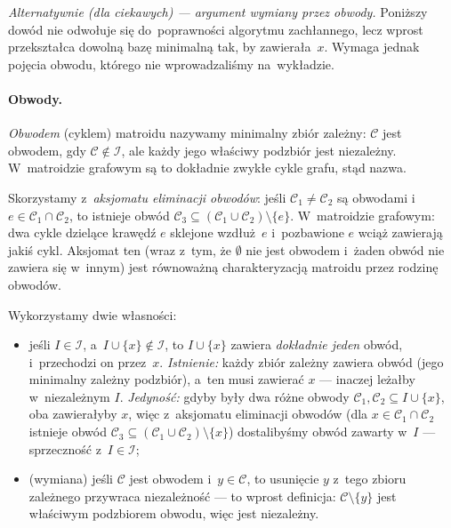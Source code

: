 \medskip
\noindent\emph{Alternatywnie (dla ciekawych) --- argument wymiany przez obwody.}
Poniższy dowód nie odwołuje się do~poprawności algorytmu zachłannego, lecz wprost
przekształca dowolną bazę minimalną tak, by zawierała~$x$. Wymaga jednak pojęcia
obwodu, którego nie wprowadzaliśmy na~wykładzie.

\paragraph{Obwody.}
\emph{Obwodem} (cyklem) matroidu nazywamy minimalny zbiór zależny: $\mathcal{C}$
jest obwodem, gdy $\mathcal{C}\notin\mathcal{I}$, ale każdy jego właściwy podzbiór
jest niezależny. W~matroidzie grafowym są to dokładnie zwykłe cykle grafu, stąd
nazwa.

\begin{dygresja}
	Skorzystamy z~\emph{aksjomatu eliminacji obwodów}: jeśli
	$\mathcal{C}_1\ne\mathcal{C}_2$ są obwodami i~$e\in\mathcal{C}_1\cap\mathcal{C}_2$,
	to istnieje obwód $\mathcal{C}_3\subseteq(\mathcal{C}_1\cup\mathcal{C}_2)
	\setminus\{e\}$. W~matroidzie grafowym: dwa cykle dzielące krawędź $e$ sklejone
	wzdłuż~$e$ i~pozbawione $e$ wciąż zawierają jakiś cykl. Aksjomat ten (wraz z~tym,
	że $\emptyset$ nie jest obwodem i~żaden obwód nie zawiera się w~innym) jest
	równoważną charakteryzacją matroidu przez rodzinę obwodów.
\end{dygresja}

Wykorzystamy dwie własności:
\begin{itemize}
	\item jeśli $I\in\mathcal{I}$, a~$I\cup\{x\}\notin\mathcal{I}$, to $I\cup\{x\}$
		zawiera \emph{dokładnie jeden} obwód, i~przechodzi on przez~$x$. \emph{Istnienie:}
		każdy zbiór zależny zawiera obwód (jego minimalny zależny podzbiór), a~ten
		musi zawierać $x$ --- inaczej leżałby w~niezależnym $I$. \emph{Jedyność:}
		gdyby były dwa różne obwody $\mathcal{C}_1,\mathcal{C}_2\subseteq I\cup\{x\}$,
		oba zawierałyby $x$, więc z~aksjomatu eliminacji obwodów (dla
		$x\in\mathcal{C}_1\cap\mathcal{C}_2$ istnieje obwód
		$\mathcal{C}_3\subseteq(\mathcal{C}_1\cup\mathcal{C}_2)\setminus\{x\}$)
		dostalibyśmy obwód zawarty w~$I$ --- sprzeczność z~$I\in\mathcal{I}$;
	\item (wymiana) jeśli $\mathcal{C}$ jest obwodem i~$y\in\mathcal{C}$, to
		usunięcie $y$ z~tego zbioru zależnego przywraca niezależność --- to wprost
		definicja: $\mathcal{C}\setminus\{y\}$ jest właściwym podzbiorem obwodu, więc
		jest niezależny.
\end{itemize}


